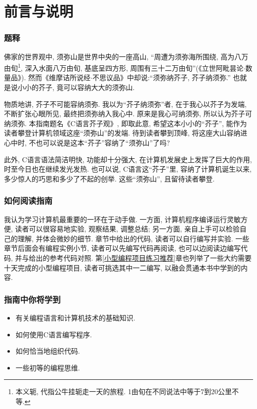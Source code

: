 \chapter*{前言与说明}
 \label{前言与说明}

    \subsection*{题释}

    佛家的世界观中, 须弥山是世界中央的一座高山, ``周遭为须弥海所围绕, 高为八万由旬\footnote{本义轭, 代指公牛挂轭走一天的旅程. 1由旬在不同说法中等于7到20公里不等.}, 深入水面八万由旬, 基底呈四方形, 周围有三十二万由旬''(《立世阿毗昙论$\cdot$数量品》). 然而《维摩诘所说经$\cdot$不思议品》中却说:``须弥纳芥子, 芥子纳须弥.'' 也就是说小小的芥子, 竟可以容纳大大的须弥山.

    物质地讲, 芥子不可能容纳须弥. 我以为``芥子纳须弥''者, 在于我心以芥子为发端, 不断扩张心眼所见, 最终把须弥纳入我心中. 原来是我心可纳须弥, 所以认为芥子可纳须弥. 本指南题名《C语言芥子观》, 即取此意, 希望这本小小的``芥子'', 能作为读者攀登计算机领域这座``须弥山''的发端. 待到读者攀到顶峰, 将这座大山容纳进心中时, 不也可以说是这本``芥子''容纳了``须弥山''了吗?

    此外, C语言语法简洁明快, 功能却十分强大, 在计算机发展史上发挥了巨大的作用, 时至今日也在继续发光发热. 也可以说, C语言这``芥子''里, 容纳了计算机诞生以来, 多少惊人的巧思和多少了不起的创举. 这些``须弥山'', 且留待读者攀登.

    \subsection*{如何阅读指南}

    我认为学习计算机最重要的一环在于动手做. 一方面, 计算机程序编译运行灵敏方便, 读者可以很容易地实验, 观察结果, 调整总结; 另一方面, 亲自上手可以检验自己的理解, 并体会微妙的细节. 章节中给出的代码, 读者可以自行编写并实验. 一些章节后面会有编程实例小节, 读者可以先编写代码再阅读, 也可以边阅读边编写代码, 并与给出的参考代码对照. 第\ref{小型编程项目练习推荐}章也列举了一些大约需要十天完成的小型编程项目, 读者可挑选其中一二编写, 以融会贯通本书中学到的内容.

    \subsection*{指南中你将学到}

    \begin{itemize}
        \item 有关编程语言和计算机技术的基础知识.
        \item 如何使用C语言编写程序.
        \item 如何恰当地组织代码.
        \item 一些初等的编程思维.
    \end{itemize}

